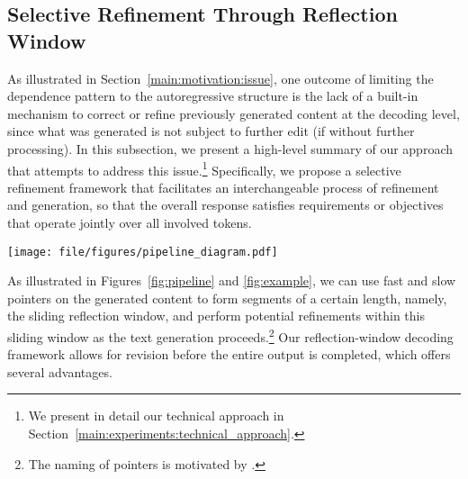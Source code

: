\subsection{Selective Refinement Through Reflection Window}\label{main:motivation:reflection_window}
As illustrated in Section~\ref{main:motivation:issue}, one outcome of limiting the dependence pattern to the autoregressive structure is the lack of a built-in mechanism to correct or refine previously generated content at the decoding level, since what was generated is not subject to further edit (if without further processing).
In this subsection, we present a high-level summary of our approach that attempts to address this issue.\footnote{We present in detail our technical approach in Section~\ref{main:experiments:technical_approach}.}
Specifically, we propose a selective refinement framework that facilitates an interchangeable process of refinement and generation, so that the overall response satisfies requirements or objectives that operate jointly over all involved tokens.

\begin{figure*}[t]
    \centering
    \texttt{[image: file/figures/pipeline\_diagram.pdf]}
    \caption{%
        Overview of our approach to address the inherent shortcoming of autoregressive decoding for text generation, where the LLM interchangeably switches between refinement and generation.
        The fast pointer pauses if the \emph{pausing criterion} is triggered, indicating the existence of a potential issue in the generated history.
        Then, the model \emph{refines/corrects} the content between the fast and slow pointers before continuing generation, so that the slow pointer catches up with the fast pointer before the latter can move on.
        Reflection window refers to the content between the fast and slow pointers.
    }
    \label{fig:pipeline}
\end{figure*}


As illustrated in Figures~\ref{fig:pipeline} and \ref{fig:example}, we can use fast and slow pointers on the generated content to form segments of a certain length, namely, the sliding reflection window, and perform potential refinements within this sliding window as the text generation proceeds.\footnote{
    The naming of pointers is motivated by \citet{kahneman2011thinking}.
}
Our reflection-window decoding framework allows for revision before the entire output is completed, which offers several advantages.

